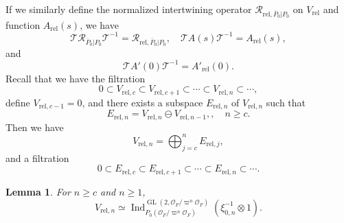 \documentclass[11pt]{amsart}
\newtheorem {lemma}      [theorem]    {Lemma}
\renewcommand{\rm}{\mathrm}
\theoremstyle{definition}
\numberwithin{equation}{section}
\begin{document}
	If we similarly define the normalized intertwining operator \(\mathscr{R}_{\rm{rel},\overline{P}_0|P_0}\) on \(V_{\rm{rel}}\) and function \(A_{\rm{rel}}(s)\), we have 
	\[\mathcal{T}\mathscr{R}_{\overline{P}_0|P_0}\mathcal{T}^{-1}=\mathscr{R}_{\rm{rel},\overline{P}_0|P_0},\quad \mathcal{T}A(s)\mathcal{T}^{-1}=A_{\rm{rel}}(s),\]and \[\mathcal{T}A'(0)\mathcal{T}^{-1}=A'_{\rm{rel}}(0).\]
	Recall that we have the filtration \[0\subset V_{\rm{rel},c}\subset V_{\rm{rel},c+1}\subset \cdots\subset V_{\rm{rel},n}\subset\cdots,\]define \(V_{\rm{rel},c-1}=0\), and there exists a subspace \(E_{\rm{rel},n}\) of \(V_{\rm{rel},n}\) such that \[E_{\text{rel},n} = V_{\text{rel},n} \ominus V_{\text{rel},n-1},,\quad n\ge c.\]Then we have 
    \[V_{\text{rel},n} = \bigoplus_{j=c}^{n} E_{\text{rel},j},\]
    and a filtration \[0\subset E_{\rm{rel},c}\subset E_{\rm{rel},c+1}\subset \cdots\subset E_{\rm{rel},n}\subset\cdots.\]
	\begin{lemma}\label{n>c}
		For \(n\ge c\) and \(n\ge 1\), \[V_{\rm{rel},n} \simeq \operatorname{Ind}_{P_0(\mathcal{O}_F/\varpi^n\mathcal{O}_F)}^{\operatorname{GL}(2,\mathcal{O}_F/\varpi^n\mathcal{O}_F)} (\xi_{0,n}^{-1} \otimes 1).\]
	\end{lemma}
\end{document}
